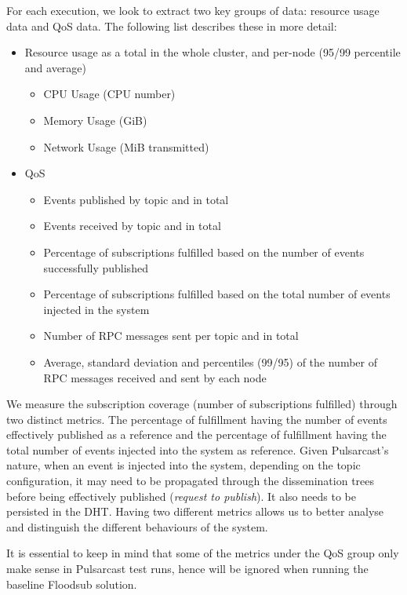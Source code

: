 For each execution, we look to extract two key groups of data: resource usage
data and QoS data. The following list describes these in more detail:

\begin{itemize}
  \item Resource usage as a total in the whole cluster, and per-node (95/99
  percentile and average)
  \begin{itemize}
    \item CPU Usage (CPU number)
    \item Memory Usage (GiB)
    \item Network Usage (MiB transmitted)
  \end{itemize}
  \item QoS
  \begin{itemize}
    \item Events published by topic and in total
    \item Events received by topic and in total
    \item Percentage of subscriptions fulfilled based on the number of events
    successfully published
    \item Percentage of subscriptions fulfilled based on the total number of events
    injected in the system
    \item Number of RPC messages sent per topic and in total
    \item Average, standard deviation and percentiles (99/95) of the number of RPC messages received and sent by each node
  \end{itemize}
\end{itemize}

We measure the subscription coverage (number of subscriptions fulfilled)
through two distinct metrics. The percentage of fulfillment having the number
of events effectively published as a reference and the percentage of
fulfillment having the total number of events injected into the system as
reference. Given Pulsarcast's nature, when an event is injected into the
system, depending on the topic configuration, it may need to be propagated
through the dissemination trees before being effectively published
(\emph{request to publish}). It also needs to be persisted in the DHT. Having
two different metrics allows us to better analyse and distinguish the different
behaviours of the system.

It is essential to keep in mind that some of the metrics under the QoS group
only make sense in Pulsarcast test runs, hence will be ignored when running the
baseline Floodsub solution.

